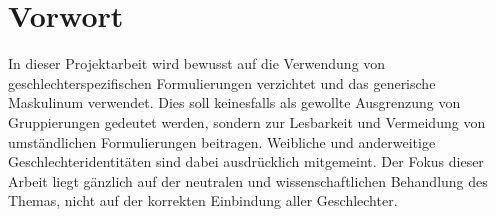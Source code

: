 \section*{Vorwort}
In dieser Projektarbeit wird bewusst auf die Verwendung von geschlechterspezifischen Formulierungen verzichtet und das generische Maskulinum verwendet. Dies soll keinesfalls als gewollte Ausgrenzung von Gruppierungen gedeutet werden, sondern zur Lesbarkeit und Vermeidung von umständlichen Formulierungen beitragen. Weibliche und anderweitige Geschlechteridentitäten sind dabei ausdrücklich mitgemeint. Der Fokus dieser Arbeit liegt gänzlich auf der neutralen und wissenschaftlichen Behandlung des Themas, nicht auf der korrekten Einbindung aller Geschlechter.
\newpage
